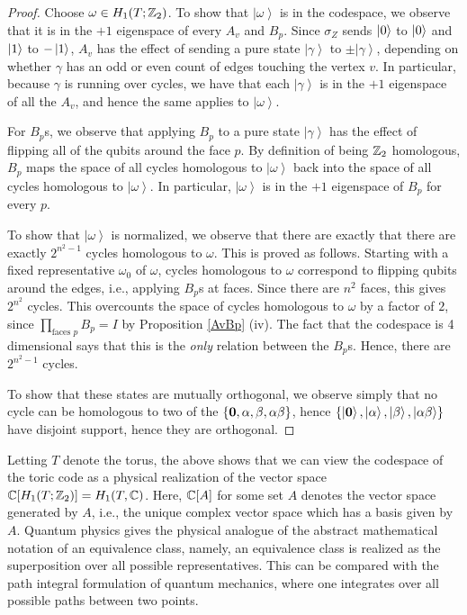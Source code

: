 \documentclass{article}
\theoremstyle{definition}
\numberwithin{figure}{section}
\begin{document}
\begin{proof} Choose $\omega\in H_1(T;\mathbb{Z}_2)$. To show that $\left|\omega\right>$ is in the codespace, we observe that it is in the $+1$ eigenspace of every $A_v$ and $B_p$. Since $\sigma_Z$ sends $\left|0\right>$ to $\left|0\right>$ and $\left|1\right>$ to $-\left|1\right>$, $A_v$ has the effect of sending a pure state $\left|\gamma\right>$ to $\pm\left|\gamma\right>$, depending on whether $\gamma$ has an odd or even count of edges touching the vertex $v$. In particular, because $\gamma$ is running over cycles, we have that each $\left|\gamma\right>$ is in the $+1$ eigenspace of all the $A_v$, and hence the same applies to $\left|\omega\right>$.

For $B_p$s, we observe that applying $B_p$ to a pure state $\left|\gamma\right>$ has the effect of flipping all of the qubits around the face $p$. By definition of being $\mathbb{Z}_2$ homologous, $B_p$ maps the space of all cycles homologous to $\left|\omega\right>$ back into the space of all cycles homologous to $\left|\omega\right>$. In particular, $\left|\omega\right>$ is in the $+1$ eigenspace of $B_p$ for every $p$.

To show that $\left|\omega\right>$ is normalized, we observe that there are exactly that there are exactly $2^{n^2-1}$ cycles homologous to $\omega$. This is proved as follows. Starting with a fixed representative $\omega_0$ of $\omega$, cycles homologous to $\omega$ correspond to flipping qubits around the edges, i.e., applying $B_p$s at faces. Since there are $n^2$ faces, this gives $2^{n^2}$ cycles. This overcounts the space of cycles homologous to $\omega$ by a factor of $2$, since $\prod_{\text{faces }p}B_p=I$ by Proposition \ref{AvBp} (iv). The fact that the codespace is 4 dimensional says that this is the \textit{only} relation between the $B_p$s. Hence, there are $2^{n^2-1}$ cycles.

To show that these states are mutually orthogonal, we observe simply that no cycle can be homologous to two of the $\{\bold{0},\alpha,\beta,\alpha\beta\}$, hence $\left\{\left|\bold{0}\right>,\left|\alpha\right>,\left|\beta\right>,\left|\alpha\beta\right>\right\}$ have disjoint support, hence they are orthogonal.
\end{proof}

Letting $T$ denote the torus, the above shows that we can view the codespace of the toric code as a physical realization of the vector space $\mathbb{C}[H_1(T;\mathbb{Z}_2)]=H_1(T,\mathbb{C})$. Here, $\mathbb{C}[A]$ for some set $A$ denotes the vector space generated by $A$, i.e., the unique complex vector space which has a basis given by $A$. Quantum physics gives the physical analogue of the abstract mathematical notation of an equivalence class, namely, an equivalence class is realized as the superposition over all possible representatives. This can be compared with the path integral formulation of quantum mechanics, where one integrates over all possible paths between two points.
\end{document}
